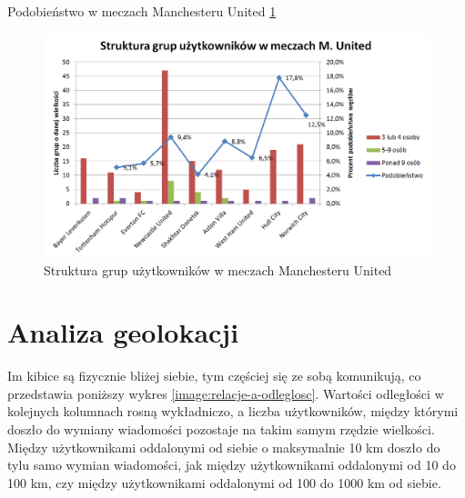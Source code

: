Podobieństwo w meczach Manchesteru United \ref{image:grupy-munited}

\begin{figure}[ht!]
\centering
\includegraphics[width=120mm]{img/grupy-munited.png}
\caption{Struktura grup użytkowników w meczach Manchesteru United}
\label{image:grupy-munited}
\end{figure}












\clearpage
\section{Analiza geolokacji}
\label{section:analizageograficzna}

Im kibice są fizycznie bliżej siebie, tym częściej się ze sobą komunikują, 
co przedstawia poniższy wykres \ref{image:relacje-a-odleglosc}.
Wartości odległości w kolejnych kolumnach rosną wykładniczo,
a liczba użytkowników, między którymi doszło do wymiany wiadomości
pozostaje na takim samym rzędzie wielkości. Między użytkownikami oddalonymi
od siebie o maksymalnie 10 km doszło do tylu samo wymian wiadomości,
jak między użytkownikami oddalonymi od 10 do 100 km, czy między użytkownikami
oddalonymi od 100 do 1000 km od siebie.

